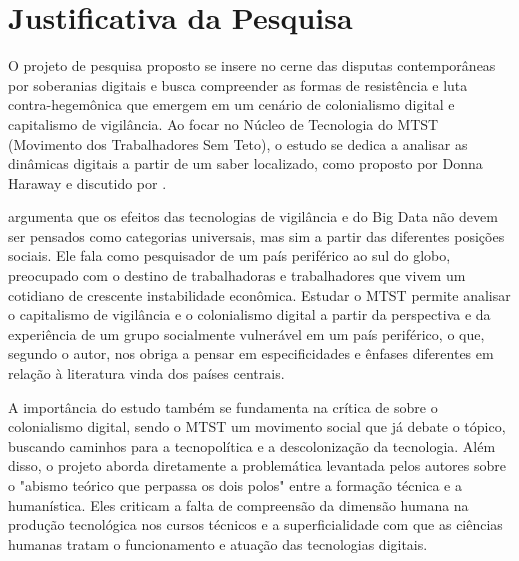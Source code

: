 \section{Justificativa da Pesquisa}
\label{sec:just}

O projeto de pesquisa proposto se insere no cerne das disputas contemporâneas por soberanias digitais e busca compreender as formas de resistência e luta contra-hegemônica que emergem em um cenário de colonialismo digital e capitalismo de vigilância. Ao focar no Núcleo de Tecnologia do MTST (Movimento dos Trabalhadores Sem Teto), o estudo se dedica a analisar as dinâmicas digitais a partir de um saber localizado, como proposto por Donna Haraway e discutido por .

 argumenta que os efeitos das tecnologias de vigilância e do Big Data não devem ser pensados como categorias universais, mas sim a partir das diferentes posições sociais. Ele fala como pesquisador de um país periférico ao sul do globo, preocupado com o destino de trabalhadoras e trabalhadores que vivem um cotidiano de crescente instabilidade econômica. Estudar o MTST permite analisar o capitalismo de vigilância e o colonialismo digital a partir da perspectiva e da experiência de um grupo socialmente vulnerável em um país periférico, o que, segundo o autor, nos obriga a pensar em especificidades e ênfases diferentes em relação à literatura vinda dos países centrais.

A importância do estudo também se fundamenta na crítica de  sobre o colonialismo digital, sendo o MTST um movimento social que já debate o tópico, buscando caminhos para a tecnopolítica e a descolonização da tecnologia. Além disso, o projeto aborda diretamente a problemática levantada pelos autores sobre o "abismo teórico que perpassa os dois polos" \cite[p.~30]{Faustino2023} entre a formação técnica e a humanística. Eles criticam a falta de compreensão da dimensão humana na produção tecnológica nos cursos técnicos e a superficialidade com que as ciências humanas tratam o funcionamento e atuação das tecnologias digitais. 

